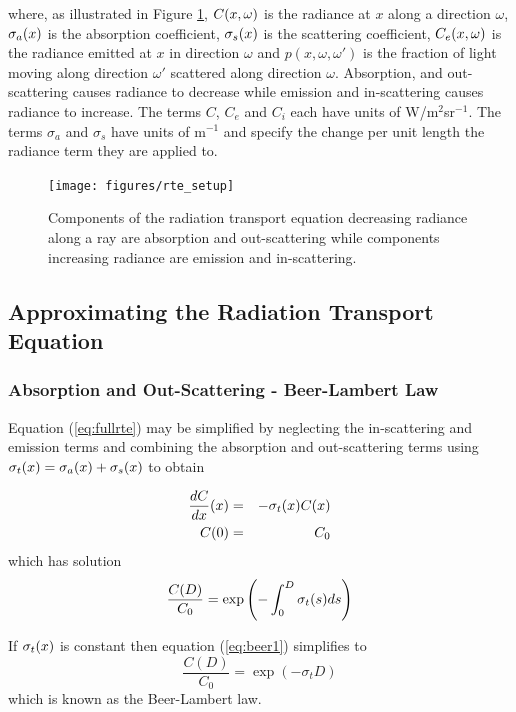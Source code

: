 \noindent where, as illustrated in Figure \ref{figRadiance}, $C(x,\omega)$ is the radiance at $x$ along a direction $\omega$, $\sigma_a(x)$ is the absorption coefficient, $\sigma_s(x)$ is the scattering coefficient, $C_e(x,\omega)$ is the radiance emitted at $x$ in direction $\omega$ and $p(x,\omega,\omega')$ is the fraction of light moving along direction $\omega'$ scattered along direction $\omega$. Absorption, and out-scattering causes radiance to decrease while emission and in-scattering causes radiance to increase. The terms $C$, $C_e$ and $C_i$ each have units of W/m$^2$sr$^{-1}$.  The terms $\sigma_a$ and $\sigma_s$ have units of m$^{-1}$ and specify the change per unit length the radiance term they are applied to.
\begin{figure}[\figoptions]
\begin{center}
\texttt{[image: figures/rte\_setup]}
\end{center}
\caption{Components of the radiation transport equation decreasing radiance along a ray are
absorption and out-scattering while components increasing radiance are emission and in-scattering.}
\label{figRadiance}
\end{figure}

%
%

\subsection{Approximating the Radiation Transport Equation}

%
%

\subsubsection{Absorption and Out-Scattering - Beer-Lambert Law}
Equation (\ref{eq:fullrte}) may be simplified by neglecting the in-scattering and emission terms and combining the absorption and out-scattering terms using $\sigma_t(x)=\sigma_a(x)+\sigma_s(x)$ to obtain

\begin{eqnarray*}
\frac{dC}{dx}(x)&=&-\sigma_t(x) C(x)\\
C(0)&=&C_0
\end{eqnarray*}
which has solution
\begin{equation}
\label{eq:beer1} \frac{C(D)}{C_0}=\exp\left({-\int_0^D \sigma_t(s) ds}\right)
\end{equation}

If $\sigma_t(x)$ is constant then equation (\ref{eq:beer1}) simplifies
to
\begin{equation}
\label{eq:beer2} \frac{C(D)}{C_0}=\exp(-\sigma_t D)
\end{equation}
which is known as the Beer-Lambert law\cite{}.

